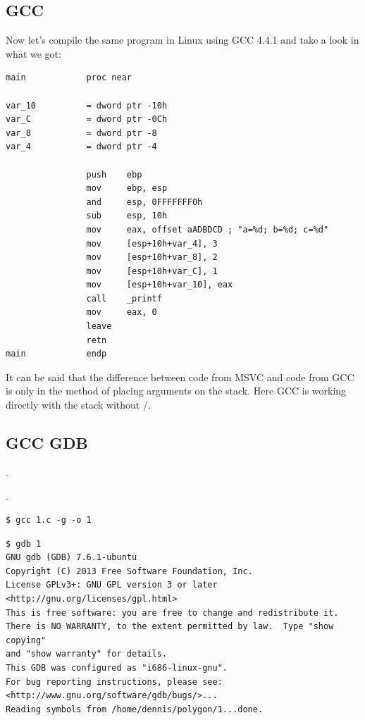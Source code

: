 \subsection{GCC}

{Now let's compile the same program in Linux using GCC 4.4.1 and take a look in \IDA what we got:}

\begin{lstlisting}
main            proc near

var_10          = dword ptr -10h
var_C           = dword ptr -0Ch
var_8           = dword ptr -8
var_4           = dword ptr -4

                push    ebp
                mov     ebp, esp
                and     esp, 0FFFFFFF0h
                sub     esp, 10h
                mov     eax, offset aADBDCD ; "a=%d; b=%d; c=%d"
                mov     [esp+10h+var_4], 3
                mov     [esp+10h+var_8], 2
                mov     [esp+10h+var_C], 1
                mov     [esp+10h+var_10], eax
                call    _printf
                mov     eax, 0
                leave
                retn
main            endp
\end{lstlisting}

{It can be said that the difference between code from MSVC and code from GCC is only in the method of placing arguments on the stack.
Here GCC is working directly with the stack without \PUSH/\POP.}

\subsection{GCC \AndENRU GDB}

.

 .

\begin{lstlisting}
$ gcc 1.c -g -o 1
\end{lstlisting}

\begin{lstlisting}
$ gdb 1
GNU gdb (GDB) 7.6.1-ubuntu
Copyright (C) 2013 Free Software Foundation, Inc.
License GPLv3+: GNU GPL version 3 or later <http://gnu.org/licenses/gpl.html>
This is free software: you are free to change and redistribute it.
There is NO WARRANTY, to the extent permitted by law.  Type "show copying"
and "show warranty" for details.
This GDB was configured as "i686-linux-gnu".
For bug reporting instructions, please see:
<http://www.gnu.org/software/gdb/bugs/>...
Reading symbols from /home/dennis/polygon/1...done.
\end{lstlisting}

